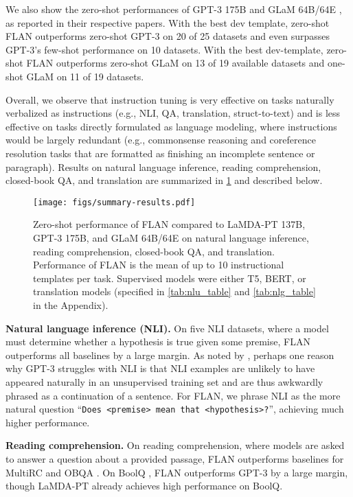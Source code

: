 \documentclass{article} \usepackage{iclr2022_conference,times}
\newcommand{\flan}{FLAN}
\newcommand{\baselm}{LaMDA-PT}
\begin{document}
We also show the zero-shot performances of GPT-3 175B \citep{brown2020language} and GLaM 64B/64E \citep{du2021glam}, as reported in their respective papers. 
With the best dev template, zero-shot \flan{} outperforms zero-shot GPT-3 on 20 of 25 datasets and even surpasses GPT-3's few-shot performance on 10 datasets. 
With the best dev-template, zero-shot \flan{} outperforms zero-shot GLaM on 13 of 19 available datasets and one-shot GLaM on 11 of 19 datasets.

Overall, we observe that instruction tuning is very effective on tasks naturally verbalized as instructions (e.g., NLI, QA, translation, struct-to-text) and is less effective on tasks directly formulated as language modeling, where instructions would be largely redundant (e.g., commonsense reasoning and coreference resolution tasks that are formatted as finishing an incomplete sentence or paragraph).
Results on natural language inference, reading comprehension, closed-book QA, and translation are summarized in \cref{fig:flan-results-summary} and described below.

\begin{figure}[h]
    \centering
    \texttt{[image: figs/summary-results.pdf]}
    \vspace{-6mm}
    \caption{Zero-shot performance of \flan{} compared to \baselm{} 137B, GPT-3 175B, and GLaM 64B/64E on natural language inference, reading comprehension, closed-book QA, and translation. 
    Performance of \flan{} is the mean of up to 10 instructional templates per task.
    Supervised models were either T5, BERT, or translation models (specified in \cref{tab:nlu_table} and \cref{tab:nlg_table} in the Appendix).
    }
    \vspace{-1mm}
    \label{fig:flan-results-summary}
\end{figure}


\textbf{Natural language inference (NLI).} 
On five NLI datasets, where a model must determine whether a hypothesis is true given some premise, FLAN outperforms all baselines by a large margin. As noted by \citet{brown2020language}, perhaps one reason why GPT-3 struggles with NLI is that NLI examples are unlikely to have appeared naturally in an unsupervised training set and are thus awkwardly phrased as a continuation of a sentence. 
For \flan{}, we phrase NLI as the more natural question ``\texttt{\small Does <premise> mean that <hypothesis>?}'', achieving much higher performance.

\textbf{Reading comprehension.} 
On reading comprehension, where models are asked to answer a question about a provided passage, FLAN outperforms baselines for MultiRC \citep{khashabi-etal-2018-looking} and OBQA \citep{mihaylov-etal-2018-suit}.
On BoolQ \citep{clark-etal-2019-boolq}, \flan{} outperforms GPT-3 by a large margin, though \baselm{} already achieves high performance on BoolQ.
\end{document}
